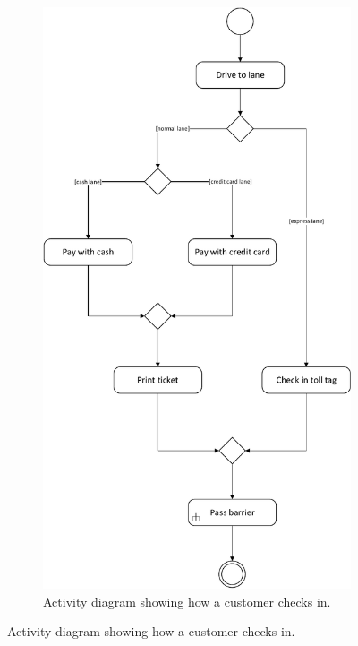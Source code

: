 \begin{figure}[H]
	\centering
	\begin{subfigure}[b]{0.6\textwidth}
	\includegraphics[width=\textwidth]{img/activity_diagrams/Check_In}
	\caption{Activity diagram showing how a customer checks in.}
	\end{subfigure}
\end{figure}

